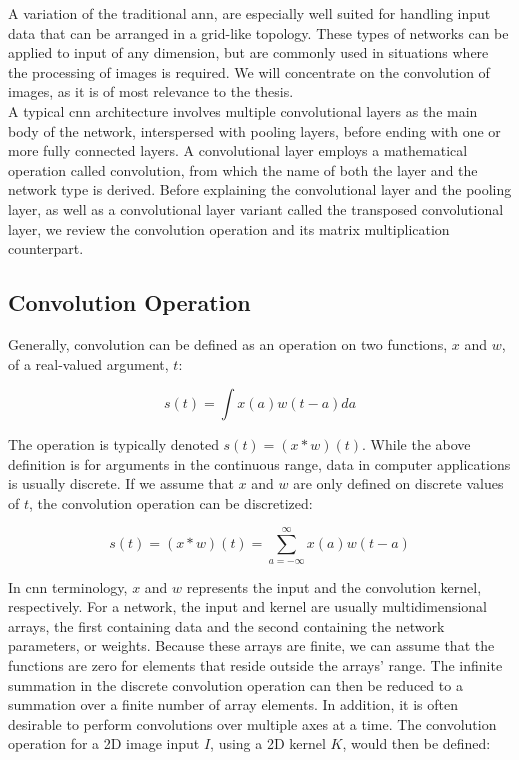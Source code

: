 A variation of the traditional \acrshort{ann},  are especially well suited for handling input data that can be arranged in a grid-like topology. These types of networks can be applied to input of any dimension, but are commonly used in situations where the processing of images is required. We will concentrate on the convolution of images, as it is of most relevance to the thesis. \\

\noindent A typical \acrshort{cnn} architecture involves multiple convolutional layers as the main body of the network, interspersed with pooling layers, before ending with one or more fully connected layers. A convolutional layer employs a mathematical operation called convolution, from which the name of both the layer and the network type is derived. Before explaining the convolutional layer and the pooling layer, as well as a convolutional layer variant called the transposed convolutional layer, we review the convolution operation and its matrix multiplication counterpart.

\subsection{Convolution Operation}

Generally, convolution can be defined as an operation on two functions, $x$ and $w$, of a real-valued argument, $t$:

\begin{equation}
s(t) = \int x(a)w(t-a) da    
\end{equation}

\noindent The operation is typically denoted $s(t) = (x*w)(t)$. While the above definition is for arguments in the continuous range, data in computer applications is usually discrete. If we assume that $x$ and $w$ are only defined on discrete values of $t$, the convolution operation can be discretized:

\begin{equation}
s(t) = (x*w)(t) = \sum_{a=-\infty}^{\infty} x(a)w(t-a)
\end{equation}

\noindent In \acrshort{cnn} terminology, $x$ and $w$ represents the input and the convolution kernel, respectively. For a network, the input and kernel are usually multidimensional arrays, the first containing data and the second containing the network parameters, or weights. Because these arrays are finite, we can assume that the functions are zero for elements that reside outside the arrays' range. The infinite summation in the discrete convolution operation can then be reduced to a summation over a finite number of array elements. In addition, it is often desirable to perform convolutions over multiple axes at a time. The convolution operation for a 2D image input $I$, using a 2D kernel $K$, would then be defined:

